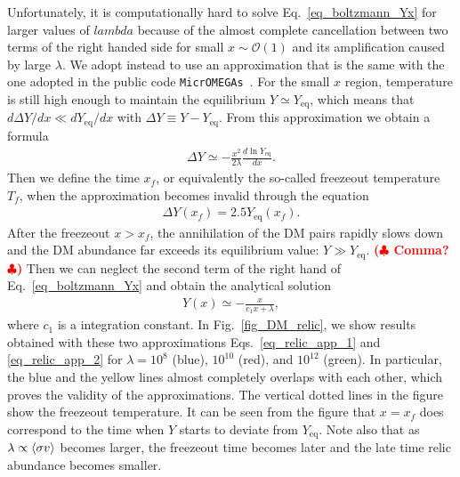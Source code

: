 \documentclass[12pt,twoside,book]{article}
\def\rem#1{ {\bf\textcolor{red}{($\clubsuit$ #1 $\clubsuit$)}}}
\begin{document}
Unfortunately, it is computationally hard to solve
Eq.~\eqref{eq_boltzmann_Yx} for larger values of $lambda$ because of the
almost complete cancellation between two terms of the right handed side
for small $x\sim \mathcal{O}(1)$ and its amplification caused by large
$\lambda$.  We adopt instead to use an approximation that is the same
with the one adopted in the public code
\texttt{MicrOMEGAs}~\cite{Belanger:2001fz, Belanger:2018mqt}.  For the
small $x$ region, temperature is still high enough to maintain the
equilibrium $Y \simeq Y_{\mathrm{eq}}$, which means that $d \Delta Y / d
x \ll d Y_{\mathrm{eq}} / d x$ with $\Delta Y \equiv Y -
Y_{\mathrm{eq}}$.  From this approximation we obtain a formula
\begin{align}
 \Delta Y \simeq -\frac{x^2}{2 \lambda} \frac{d \ln Y_{\mathrm{eq}}}{d x}.\label{eq_relic_app_1}
\end{align}
Then we define the time $x_f$, or equivalently the so-called freezeout
temperature $T_f$, when the approximation becomes invalid through the
equation
\begin{align}
 \Delta Y (x_f) = 2.5 Y_{\mathrm{eq}} (x_f).
\end{align}
After the freezeout $x > x_f$, the annihilation of the DM pairs
rapidly slows down and the DM abundance far exceeds its equilibrium
value: $Y \gg Y_{\mathrm{eq}}$.  \rem{Comma?}  Then we can neglect the
second term of the right hand of Eq.~\eqref{eq_boltzmann_Yx} and
obtain the analytical solution
\begin{align}
 Y(x) \simeq - \frac{x}{c_1 x + \lambda},\label{eq_relic_app_2}
\end{align}
where $c_1$ is a integration constant.  In Fig.~\ref{fig_DM_relic}, we
show results obtained with these two approximations
Eqs.~\eqref{eq_relic_app_1} and \eqref{eq_relic_app_2} for $\lambda =
10^8$ (blue), $10^{10}$ (red), and $10^{12}$ (green).  In particular,
the blue and the yellow lines almost completely overlaps with each
other, which proves the validity of the approximations.  The vertical
dotted lines in the figure show the freezeout temperature.  It can be
seen from the figure that $x = x_f$ does correspond to the time when $Y$
starts to deviate from $Y_{\mathrm{eq}}$.  Note also that as $\lambda
\propto \Braket{\sigma v}$ becomes larger, the freezeout time becomes
later and the late time relic abundance becomes smaller.
\end{document}
